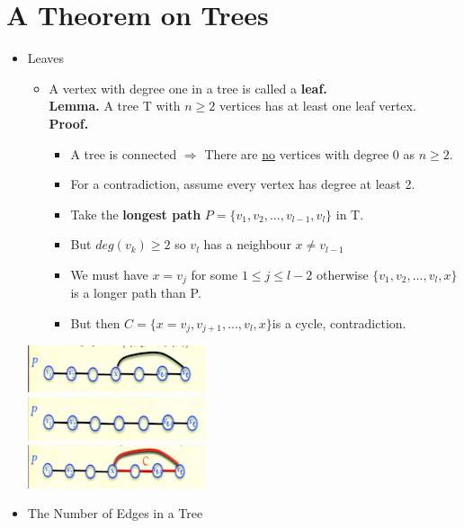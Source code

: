\documentclass[12pt]{article}
\begin{document}
\section{A Theorem on Trees}
\renewcommand{\labelitemii}{$\circ$}
\renewcommand{\labelitemiii}{$\cdot$}
\renewcommand{\labelitemiii}{$\rightarrow$}
\renewcommand{\labelitemiv}{$\star$}
\begin{itemize}
\item Leaves
	\begin{itemize}
	\item A vertex with degree one in a tree is called a \textbf{leaf.}\\
	\textbf{Lemma.} A tree T with $n \geq 2 $ vertices has at least one leaf vertex.\\
	\textbf{Proof.}
	\begin{itemize}
	\item A tree is connected $\Rightarrow$ There are \underline{no} vertices with degree 0 as $n \geq 2.$
	\item For a contradiction, assume every vertex has degree at least 2.
	\item Take the \textbf{longest path} $P = \{v_1,v_2,...,v_{l-1},v_l\}$ in T.
	\item But $deg(v_k) \geq 2$ so $v_l$ has a neighbour $x \neq v_{l-1}$
	\item We must have $x = v_j$ for some $1 \leq j \leq l-2$ otherwise $\{v_1, v_2, ... , v_l, x\}$ is a longer path than P.
	\item But then $C = \{x= v_j, v_{j+1}, ..., v_l, x\}$is a cycle, contradiction.
	\end{itemize}
	\end{itemize}
\begin{center}
\includegraphics{lecture720}\\
\includegraphics{lecture721}\\
\includegraphics{lecture722}
\end{center}
\item The Number of Edges in a Tree\\

\end{itemize}
\end{document}
